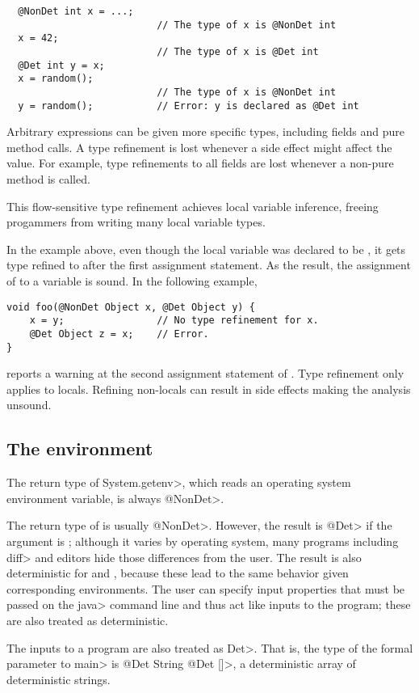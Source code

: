 \begin{verbatim}
  @NonDet int x = ...;
                          // The type of x is @NonDet int
  x = 42;
                          // The type of x is @Det int
  @Det int y = x;
  x = random();
                          // The type of x is @NonDet int
  y = random();           // Error: y is declared as @Det int
\end{verbatim}

Arbitrary expressions can be given more specific types, including fields
and pure method calls.  A type refinement is lost whenever a side effect
might affect the value.  For example, type refinements to all fields are
lost whenever a non-pure method is called.

This flow-sensitive type refinement achieves local variable inference,
freeing progammers from writing many local variable types.


In the example above, even though the local variable  was declared to be , it gets
type refined to  after the first assignment statement. As the result, the assignment of 
to a  variable  is sound. In the following example,
\begin{verbatim}
void foo(@NonDet Object x, @Det Object y) {
    x = y;                // No type refinement for x.
    @Det Object z = x;    // Error.
}
\end{verbatim}
\theDeterminismChecker reports a warning at the second assignment statement of . Type refinement only applies to locals. Refining non-locals can result in side effects making the analysis unsound.


\subsection{The environment}\label{sec:environment-java}

The return type of \<System.getenv>, which reads an operating system
environment variable, is always \<@NonDet>.

The return type of  is usually \<@NonDet>. However,
the result is \<@Det> if the argument is ; although
it varies by operating system, many programs including \<diff> and editors hide those
differences from the user.
The result is also deterministic for  and
, because these lead to the same behavior given
corresponding environments.
The user can specify input properties that must be passed on the \<java>
command line and thus act like inputs to the program; these are also
treated as deterministic.

The inputs to a program are also treated as \<Det>.  That is, the type of
the formal parameter to \<main> is
\<@Det String @Det []>, a deterministic array of deterministic strings.

